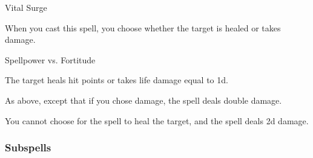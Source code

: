 \newpage
\begin{spellsection}{Vital Surge}

\begin{spellcontent}

\begin{spelltargetinginfo}




\end{spelltargetinginfo}


\begin{spelleffects}
\spellspecial
When you cast this spell, you choose whether the target is healed or takes damage.




\begin{spellattack}{Spellpower vs. Fortitude}


\spellsuccess The target heals hit points or takes life damage equal to  \plus1d.


\spellcritical As above, except that if you chose damage, the spell deals double damage.


\end{spellattack}





\end{spelleffects}

\end{spellcontent}
\begin{spellfooter}


\end{spellfooter}
\begin{spellsubcontent}


\begin{spellcantrip}
You cannot choose for the spell to heal the target, and the spell deals \minus2d damage.
\end{spellcantrip}


\end{spellsubcontent}
\end{spellsection}


\subsubsection{Subspells}



